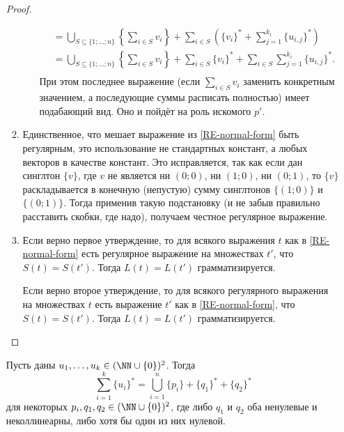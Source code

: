\documentclass[12pt,a4paper]{article}
\begin{document}
\begin{problem}{8}
\begin{enumerate}
\begin{proof}
\begin{enumerate}
\begin{itemize}
\begin{align*}
                                        &= \bigcup_{S \subseteq \{1; \dots; n\}} \left\{\sum_{i \in S} v_i\right\} + \sum_{i \in S} \left(\{v_i\}^* + \sum_{j=1}^{k_i} \{u_{i, j}\}^*\right)\\
                                        &= \bigcup_{S \subseteq \{1; \dots; n\}} \left\{\sum_{i \in S} v_i\right\} + \sum_{i \in S} \{v_i\}^* + \sum_{i \in S} \sum_{j=1}^{k_i} \{u_{i, j}\}^*.\\
                                    \end{align*}
                                    При этом последнее выражение (если $\sum_{i \in S} v_i$ заменить конкретным значением, а последующие суммы расписать полностью) имеет подабающий вид. Оно и пойдёт на роль искомого $p'$.
                            \end{itemize}
                        \item Единственное, что мешает выражение из \ref{RE-normal-form} быть регулярным, это использование не стандартных констант, а любых векторов в качестве констант. Это исправляется, так как если дан синглтон $\{v\}$, где $v$ не является ни $(0; 0)$, ни $(1; 0)$, ни $(0; 1)$, то $\{v\}$ раскладывается в конечную (непустую) сумму синглтонов $\{(1; 0)\}$ и $\{(0; 1)\}$. Тогда применив такую подстановку (и не забыв правильно расставить скобки, где надо), получаем честное регулярное выражение.
                        \item Если верно первое утверждение, то для всякого выражения $t$ как в \ref{RE-normal-form} есть регулярное выражение на множествах $t'$, что $S(t) = S(t')$. Тогда $L(t) = L(t')$ грамматизируется.
                        
                            Если верно второе утверждение, то для всякого регулярного выражения на множествах $t$ есть выражение $t'$ как в \ref{RE-normal-form}, что $S(t) = S(t')$. Тогда $L(t) = L(t')$ грамматизируется.
                    \end{enumerate}
                \end{proof}
                
                \begin{lemma}
                    Пусть даны $u_1, \dots, u_k \in (\NN \cup \{0\})^2$. Тогда
                    \[\sum_{i=1}^k \{u_i\}^* = \bigcup_{i=1}^n \{p_i\} + \{q_1\}^* + \{q_2\}^*\]
                    для некоторых $p_i, q_1, q_2 \in (\NN \cup \{0\})^2$, где либо $q_1$ и $q_2$ оба ненулевые и неколлинеарны, либо хотя бы один из них нулевой.
                \end{lemma}


\end{enumerate}
\end{problem}
\end{document}

